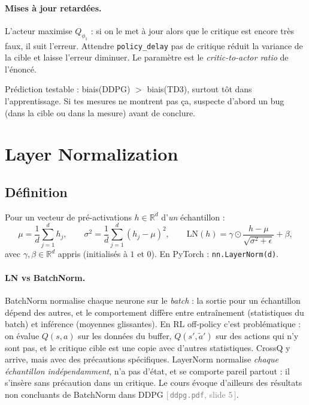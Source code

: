 \documentclass[11pt,a4paper]{article}
\newcommand{\code}[1]{\texttt{#1}}
\newcommand{\slide}[2]{\textcolor{gray}{[\,\code{#1}, slide #2\,]}}
\begin{document}
\paragraph{Mises à jour retardées.} L'acteur maximise $Q_{\phi_1}$ : si on le met à jour alors que
le critique est encore très faux, il suit l'erreur. Attendre \code{policy\_delay} pas de critique
réduit la variance de la cible et laisse l'erreur diminuer. Le paramètre est le
\emph{critic-to-actor ratio} de l'énoncé.

\begin{keybox}
Prédiction testable : biais(DDPG) $>$ biais(TD3), surtout tôt dans l'apprentissage. Si tes mesures
ne montrent pas ça, suspecte d'abord un bug (dans la cible ou dans la mesure) avant de conclure.
\end{keybox}

\section{Layer Normalization}

\subsection{Définition}
Pour un vecteur de pré-activations $h\in\mathbb R^d$ d'\emph{un} échantillon \citep{ba2016layernorm} :
\begin{equation}
  \mu = \frac1d\sum_{j=1}^d h_j,\qquad \sigma^2 = \frac1d\sum_{j=1}^d (h_j-\mu)^2,\qquad
  \mathrm{LN}(h) = \gamma\odot\frac{h-\mu}{\sqrt{\sigma^2+\epsilon}} + \beta,
\end{equation}
avec $\gamma,\beta\in\mathbb R^d$ appris (initialisés à $1$ et $0$). En PyTorch :
\code{nn.LayerNorm(d)}.

\paragraph{LN vs BatchNorm.} BatchNorm \citep{ioffe2015batchnorm} normalise chaque neurone sur le
\emph{batch} : la sortie pour un échantillon dépend des autres, et le comportement diffère entre
entraînement (statistiques du batch) et inférence (moyennes glissantes). En RL off-policy c'est
problématique : on évalue $Q(s,a)$ sur les données du buffer, $Q(s',\tilde a')$ sur des actions qui
n'y sont pas, et le critique cible est une copie avec d'autres statistiques. CrossQ
\citep{bhatt2024crossq} y arrive, mais avec des précautions spécifiques. LayerNorm normalise
\emph{chaque échantillon indépendamment}, n'a pas d'état, et se comporte pareil partout : il
s'insère sans précaution dans un critique. Le cours évoque d'ailleurs des résultats non concluants de
BatchNorm dans DDPG \slide{ddpg.pdf}{5}.
\end{document}
